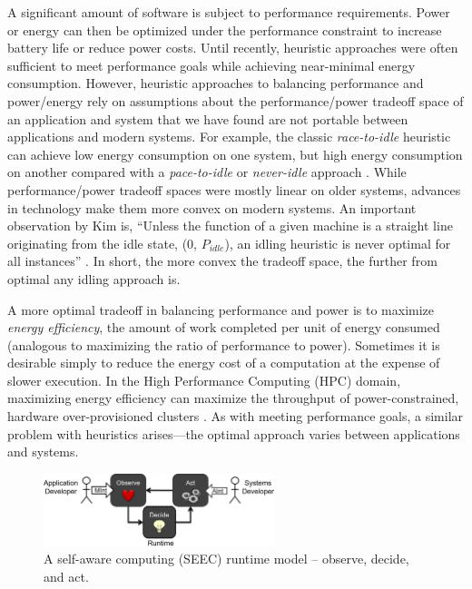 A significant amount of software is subject to performance requirements.
Power or energy can then be optimized under the performance constraint to increase battery life or reduce power costs.
Until recently, heuristic approaches were often sufficient to meet performance goals while achieving near-minimal energy consumption.
However, heuristic approaches to balancing performance and power/energy rely on assumptions about the performance/power tradeoff space of an application and system that we have found are not portable between applications and modern systems.
For example, the classic \emph{race-to-idle} heuristic can achieve low energy consumption on one system, but high energy consumption on another compared with a \emph{pace-to-idle} or \emph{never-idle} approach \cite{Imes2014}.
While performance/power tradeoff spaces were mostly linear on older systems, advances in technology make them more convex on modern systems.
An important observation by Kim \etal is, ``Unless the function of a given machine is a straight line originating from the idle state, (0, $P_{idle}$), an idling heuristic is never optimal for all instances'' \cite{kim-cpsna2015}.
In short, the more convex the tradeoff space, the further from optimal any idling approach is.

A more optimal tradeoff in balancing performance and power is to maximize \emph{energy efficiency}, \ie the amount of work completed per unit of energy consumed (analogous to maximizing the ratio of performance to power).
Sometimes it is desirable simply to reduce the energy cost of a computation at the expense of slower execution.
In the High Performance Computing (HPC) domain, maximizing energy efficiency can maximize the throughput of power-constrained, hardware over-provisioned clusters \cite{PatkiRMAP}.
As with meeting performance goals, a similar problem with heuristics arises---the optimal approach varies between applications and systems.


\begin{figure}[t]
  \begin{centering}
  \includegraphics[width=0.6\textwidth]{figs/SEEC.png}
  \caption{A self-aware computing (SEEC) runtime model -- observe, decide, and act.}
  \label{fig:seec}
  \end{centering}
\end{figure}

